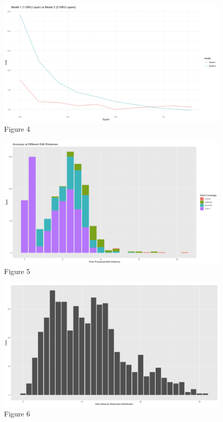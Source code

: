 \documentclass[
]{article}
\begin{document}
\begin{figure}
\centering
\includegraphics{"../Figures/Figure_4.png"}
\caption{Figure 4}
\end{figure}

\begin{figure}
\centering
\includegraphics{"../Figures/Figure_5.png"}
\caption{Figure 5}
\end{figure}

\begin{figure}
\centering
\includegraphics{"../Figures/Figure_6.png"}
\caption{Figure 6}
\end{figure}
\end{document}
